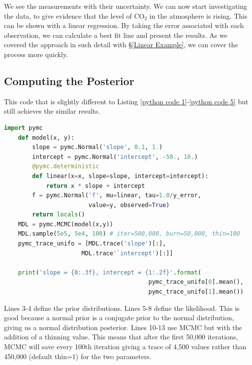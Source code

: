 \documentclass[12pt,twoside]{report}   %
\def\StartLineAt#1{\lstset{firstnumber=#1}}
\begin{document}
We see the measurements with their uncertainty. We can now start investigating the data, to give evidence that the level of $\mathrm{CO_2}$ in the atmosphere is rising. This can be shown with a linear regression. By taking the error associated with each observation, we can calculate a best fit line and present the results. As we covered the approach in such detail with \S\ref{Linear Example}, we can cover the process more quickly.

\subsection{Computing the Posterior}\label{Computing the Posterior3}

This code that is slightly different to Listing \ref{python code 1}-\ref{python code 5} but still achieves the similar results.
\StartLineAt1
\begin{lstlisting}[label={python code 7},caption={Climate change code snippet},language=Python]
	import pymc
	def model(x, y): 
    	slope = pymc.Normal('slope', 0.1, 1.)
    	intercept = pymc.Normal('intercept', -50., 10.)
    	@pymc.deterministic
    	def linear(x=x, slope=slope, intercept=intercept):
        	return x * slope + intercept
    	f = pymc.Normal('f', mu=linear, tau=1.0/y_error,
    	                value=y, observed=True)
    	return locals()
	MDL = pymc.MCMC(model(x,y))
	MDL.sample(5e5, 5e4, 100) # iter=500,000, burn=50,000, thin=100
	pymc_trace_unifo = [MDL.trace('slope')[:],
                      MDL.trace'`intercept')[:]]

	print('slope = {0:.3f}, intercept = {1:.2f}'.format(
	                                     pymc_trace_unifo[0].mean(),
	                                     pymc_trace_unifo[1].mean())
\end{lstlisting}

Lines 3-4 define the prior distributions. Lines 5-8 define the likelihood. This is good because a normal prior is a conjugate prior to the normal distribution, giving us a normal distribution posterior. Lines 10-13 use MCMC but with the addition of a thinning value. This means that after the first 50,000 iterations, MCMC will save every 100th iteration giving a trace of 4,500 values rather than 450,000 (default thin=1) for the two parameters. 
\end{document}

